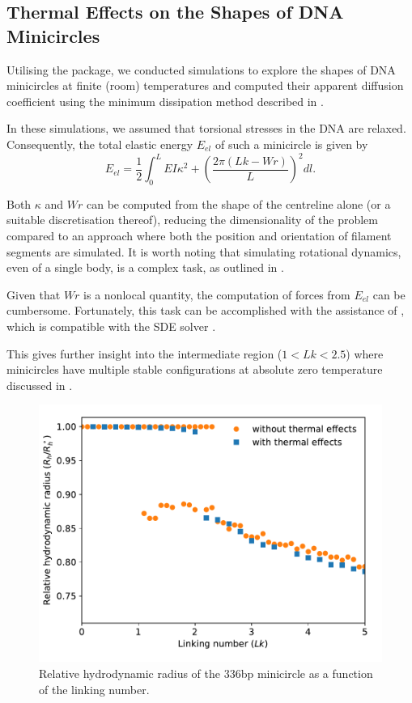 \documentclass{doctoral}
\newcommand{\code}[1]{\texttt{\detokenize{#1}}}
\begin{document}
\subsection{Thermal Effects on the Shapes of DNA Minicircles}

Utilising the \code{pychastic} package, we conducted simulations to explore the shapes of DNA minicircles at finite (room) temperatures and computed their apparent diffusion coefficient using the minimum dissipation method described in \textcite{Cichocki_2019}.

In these simulations, we assumed that torsional stresses in the DNA are relaxed.
Consequently, the total elastic energy $E_{el}$ of such a minicircle is given by
\begin{equation}
    E_{el} = \frac{1}{2} \int_0^L EI \kappa^2 + \left( \frac{2\pi (Lk - Wr)}{L} \right)^2 dl.
\end{equation}

Both $\kappa$ and $Wr$ can be computed from the shape of the centreline alone (or a suitable discretisation thereof), reducing the dimensionality of the problem compared to an approach where both the position and orientation of filament segments are simulated.
It is worth noting that simulating rotational dynamics, even of a single body, is a complex task, as outlined in \textcite{Waszkiewicz_2023_pychastic}.

Given that $Wr$ is a nonlocal quantity, the computation of forces from $E_{el}$ can be cumbersome.
Fortunately, this task can be accomplished with the assistance of \code{jax.grad}, which is compatible with the SDE solver \code{pychastic}.

This gives further insight into the intermediate region ($1 < Lk < 2.5$) where minicircles have multiple stable configurations at absolute zero temperature discussed in \textcite{Waszkiewicz_2023_dna}.

\begin{figure}[htbp]
    \centering
    \includegraphics[height=0.5\linewidth]{figures/with_thermal_effects.pdf}
    \caption{Relative hydrodynamic radius of the 336bp minicircle as a function of the linking number.}
    \label{fig:thermalized_loops}
\end{figure}
\end{document}
